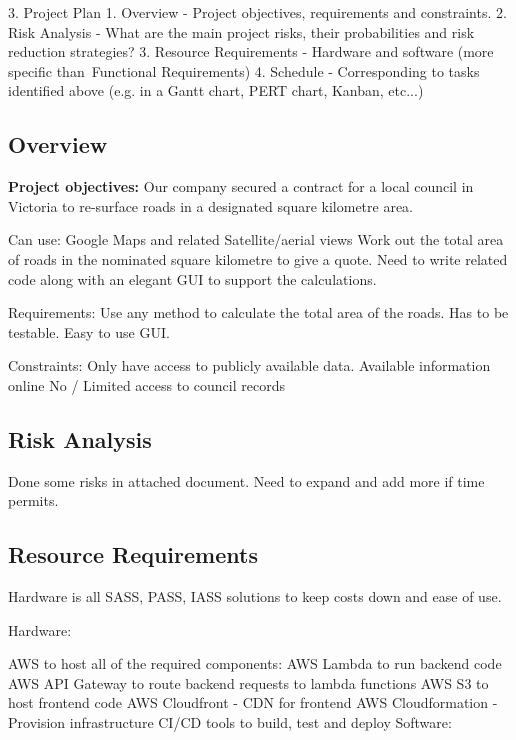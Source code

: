 \documentclass[a4paper,11pt]{article}
\begin{document}

3. Project Plan
  1. Overview - Project objectives, requirements and constraints.
  2. Risk Analysis - What are the main project risks, their probabilities and risk reduction strategies?
  3. Resource Requirements - Hardware and software (more specific than Functional Requirements)
  4. Schedule - Corresponding to tasks identified above (e.g. in a Gantt chart, PERT chart, Kanban, etc...)


\subsection{Overview}


\textbf{Project objectives:} Our company secured a contract for a local council in Victoria to re-surface roads in a designated square kilometre area.

Can use:
Google Maps and related
Satellite/aerial views
Work out the total area of roads in the nominated square kilometre to give a quote.
Need to write related code along with an elegant GUI to support the calculations.

Requirements:
Use any method to calculate the total area of the roads.
Has to be testable.
Easy to use GUI.

Constraints:
Only have access to publicly available data.
Available information online
No / Limited access to council records

\subsection{Risk Analysis}


Done some risks in attached document. Need to expand and add more if time permits.

\subsection{Resource Requirements}


Hardware is all SASS, PASS, IASS solutions to keep costs down and ease of use.

Hardware:

AWS to host all of the required components:
AWS Lambda to run backend code
AWS API Gateway to route backend requests to lambda functions
AWS S3 to host frontend code
AWS Cloudfront - CDN for frontend
AWS Cloudformation - Provision infrastructure
CI/CD tools to build, test and deploy
Software:
\end{document}

